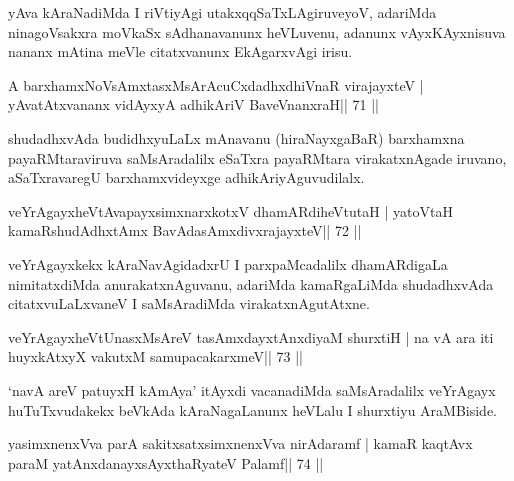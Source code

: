 \begin{artha}
yAva kAraNadiMda I riVtiyAgi utakxqqSaTxLAgiruveyoV, adariMda ninagoVsakxra moVkaSx sAdhanavanunx heVLuvenu, adanunx vAyxKAyxnisuva nananx mAtina meVle citatxvanunx EkAgarxvAgi irisu.
\end{artha}


\begin{shl}
A barxhamxNoV\s sAmxtasxMsArAcuCxdadhxdhiVnaR virajayxteV |
yAvatAtxvananx vidAyxyA adhikAriV BaveVnanxraH\hfill || 71 ||
\end{shl}

\begin{artha}
shudadhxvAda budidhxyuLaLx mAnavanu (hiraNayxgaBaR) barxhamxna payaRMtaraviruva saMsAradalilx eSaTxra payaRMtara virakatxnAgade iruvano, aSaTxravaregU barxhamxvideyxge adhikAriyAguvudilalx.
\end{artha}

\begin{shl}
veYrAgayxheVtAvapayxsimxnarxkotxV dhamARdiheVtutaH |
yatoV\s taH kamaRshudAdhxtAmx BavAdasAmxdivxrajayxteV\hfill || 72 ||
\end{shl}

\begin{artha}
veYrAgayxkekx kAraNavAgidadxrU I parxpaMcadalilx dhamARdigaLa nimitatxdiMda anurakatxnAguvanu, adariMda kamaRgaLiMda shudadhxvAda citatxvuLaLxvaneV I saMsAradiMda virakatxnAgutAtxne.
\end{artha}


\begin{shl}
veYrAgayxheVtUnasxMsAreV tasAmxdayxtAnxdiyaM shurxtiH |
na vA ara iti huyxkAtxyX vakutxM samupacakarxmeV\hfill || 73 ||
\end{shl}

\begin{artha}
`navA areV patuyxH kAmAya' itAyxdi vacanadiMda saMsAradalilx veYrAgayx   huTuTxvudakekx beVkAda kAraNagaLanunx heVLalu I shurxtiyu AraMBiside.
\end{artha}


\begin{shl}
yasimxnenxVva parA sakitxsatxsimxnenxVva nirAdaramf |
kamaR kaqtAvx paraM yatAnxdanayxsAyxthaRyateV Palamf\hfill || 74 ||
\end{shl}

